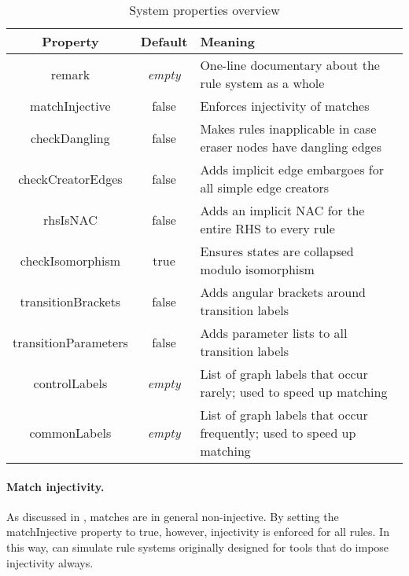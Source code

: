\begin{table}
\begin{center}
\begin{tabular}{|c|c|l|}
\hline\hline
\bf Property & \bf Default & \bf Meaning \\
\hline
\sf remark
  & \it empty
  & One-line documentary about the rule system as a whole \\
\sf matchInjective 
  & \sf false
  & Enforces injectivity of matches \\
\sf checkDangling
  & \sf false
  & Makes rules inapplicable in case eraser nodes have dangling edges \\
\sf checkCreatorEdges
  & \sf false
  & Adds implicit edge embargoes for all simple edge creators \\
\sf rhsIsNAC
  & \sf false
  & Adds an implicit NAC for the entire RHS to every rule \\
\sf checkIsomorphism
  & \sf true
  & Ensures states are collapsed modulo isomorphism \\
\sf transitionBrackets
  & \sf false
  & Adds angular brackets around transition labels
  \\
\sf transitionParameters
  & \sf false
  & Adds parameter lists to all transition labels \\
\sf controlLabels 
  & \it empty
  & List of graph labels that occur rarely; used to speed up matching \\
\sf commonLabels
  & \it empty
  & List of graph labels that occur frequently; used to speed up matching \\
\hline\hline
\end{tabular}
\end{center}
\caption{System properties overview}
\vspace*{-\medskipamount}
\vspace*{-\medskipamount}
\end{table}

\paragraph{Match injectivity.}

As discussed in , matches are in general non-injective. By
setting the \textsf{matchInjective} property to \textsf{true}, however,
injectivity is enforced for all rules. In this way, \Groove{} can simulate rule
systems originally designed for tools that do impose injectivity always.

